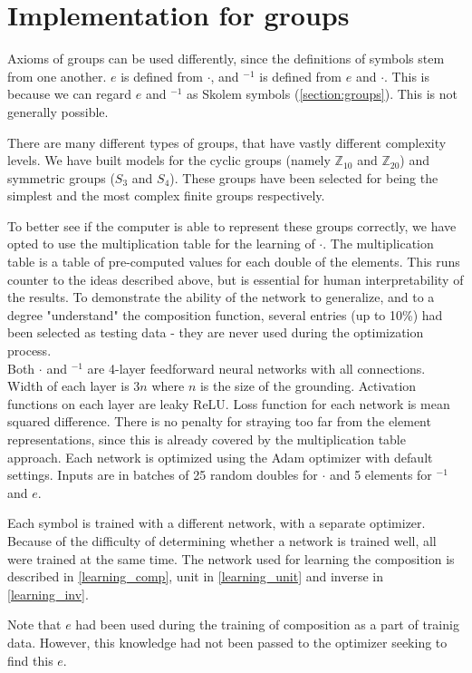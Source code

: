 \section{Implementation for groups}
\label{section:group_impl}
Axioms of groups can be used differently, since the definitions of symbols stem from one another. $e$ is defined from $\cdot$, and $^{-1}$ is defined from $e$ and $\cdot$. This is because we can regard $e$ and $^{-1}$ as Skolem symbols (\autoref{section:groups}). This is not generally possible.

There are many different types of groups, that have vastly different complexity levels. We have built models for the cyclic groups (namely $\mathbb{Z}_{10}$ and $\mathbb{Z}_{20}$) and symmetric groups ($S_3$ and $S_4$). These groups have been selected for being the simplest and the most complex finite groups respectively.

To better see if the computer is able to represent these groups correctly, we have opted to use the multiplication table for the learning of $\cdot$. The multiplication table is a table of pre-computed values for each double of the elements. This runs counter to the ideas described above, but is essential for human interpretability of the results. To demonstrate the ability of the network to generalize, and to a degree "understand" the composition function, several entries (up to 10\%) had been selected as testing data - they are never used during the optimization process.\\

Both $\cdot$ and $^{-1}$ are 4-layer feedforward neural networks with all connections. Width of each layer is $3n$ where $n$ is the size of the grounding. Activation functions on each layer are leaky ReLU. Loss function for each network is mean squared difference. There is no penalty for straying too far from the element representations, since this is already covered by the multiplication table approach. Each network is optimized using the Adam optimizer with default settings. Inputs are in batches of 25 random doubles for $\cdot$ and 5 elements for $^{-1}$ and $e$. 

Each symbol is trained with a different network, with a separate optimizer. Because of the difficulty of determining whether a network is trained well, all were trained at the same time. The network used for learning the composition is described in \autoref{learning_comp}, unit in \autoref{learning_unit} and inverse in \autoref{learning_inv}. 

Note that $e$ had been used during the training of composition as a part of trainig data. However, this knowledge had not been passed to the optimizer seeking to find this $e$.

